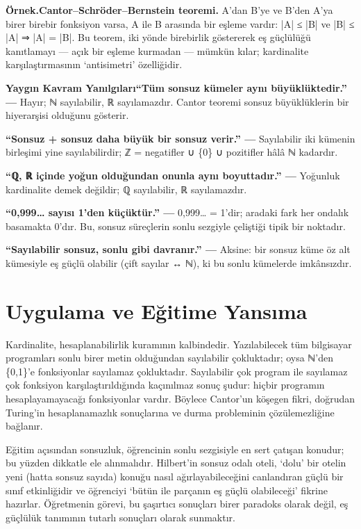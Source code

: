 \begin{tcolorbox}[bookbox,colback=cEx]\textbf{\textsf{\textcolor{cAcc}{Örnek.}}}\quad \textbf{Cantor–Schröder–Bernstein teoremi. }A’dan B’ye ve B’den A’ya birer birebir fonksiyon varsa, A ile B arasında bir eşleme vardır: |A| ≤ |B| ve |B| ≤ |A| ⇒ |A| = |B|. Bu teorem, iki yönde birebirlik göstererek eş güçlülüğü kanıtlamayı — açık bir eşleme kurmadan — mümkün kılar; kardinalite karşılaştırmasının ‘antisimetri’ özelliğidir.\end{tcolorbox}

\begin{tcolorbox}[bookbox,colback=cMis]\textbf{\textsf{\textcolor{cAcc}{Yaygın Kavram Yanılgıları}}}\quad \textbf{“Tüm sonsuz kümeler aynı büyüklüktedir.” — }Hayır; ℕ sayılabilir, ℝ sayılamazdır. Cantor teoremi sonsuz büyüklüklerin bir hiyerarşisi olduğunu gösterir.\par\medskip{}\textbf{“Sonsuz + sonsuz daha büyük bir sonsuz verir.” — }Sayılabilir iki kümenin birleşimi yine sayılabilirdir; ℤ = negatifler ∪ \{0\} ∪ pozitifler hâlâ ℕ kadardır.\par\medskip{}\textbf{“ℚ, ℝ içinde yoğun olduğundan onunla aynı boyuttadır.” — }Yoğunluk kardinalite demek değildir; ℚ sayılabilir, ℝ sayılamazdır.\par\medskip{}\textbf{“0,999… sayısı 1’den küçüktür.” — }0,999… = 1’dir; aradaki fark her ondalık basamakta 0’dır. Bu, sonsuz süreçlerin sonlu sezgiyle çeliştiği tipik bir noktadır.\par\medskip{}\textbf{“Sayılabilir sonsuz, sonlu gibi davranır.” — }Aksine: bir sonsuz küme öz alt kümesiyle eş güçlü olabilir (çift sayılar ↔ ℕ), ki bu sonlu kümelerde imkânsızdır.\end{tcolorbox}

\section{Uygulama ve Eğitime Yansıma}

Kardinalite, hesaplanabilirlik kuramının kalbindedir. Yazılabilecek tüm bilgisayar programları sonlu birer metin olduğundan sayılabilir çokluktadır; oysa ℕ’den \{0,1\}’e fonksiyonlar sayılamaz çokluktadır. Sayılabilir çok program ile sayılamaz çok fonksiyon karşılaştırıldığında kaçınılmaz sonuç şudur: hiçbir programın hesaplayamayacağı fonksiyonlar vardır. Böylece Cantor’un köşegen fikri, doğrudan Turing’in hesaplanamazlık sonuçlarına ve durma probleminin çözülemezliğine bağlanır.

Eğitim açısından sonsuzluk, öğrencinin sonlu sezgisiyle en sert çatışan konudur; bu yüzden dikkatle ele alınmalıdır. Hilbert’in sonsuz odalı oteli, ‘dolu’ bir otelin yeni (hatta sonsuz sayıda) konuğu nasıl ağırlayabileceğini canlandıran güçlü bir sınıf etkinliğidir ve öğrenciyi ‘bütün ile parçanın eş güçlü olabileceği’ fikrine hazırlar. Öğretmenin görevi, bu şaşırtıcı sonuçları birer paradoks olarak değil, eş güçlülük tanımının tutarlı sonuçları olarak sunmaktır.

